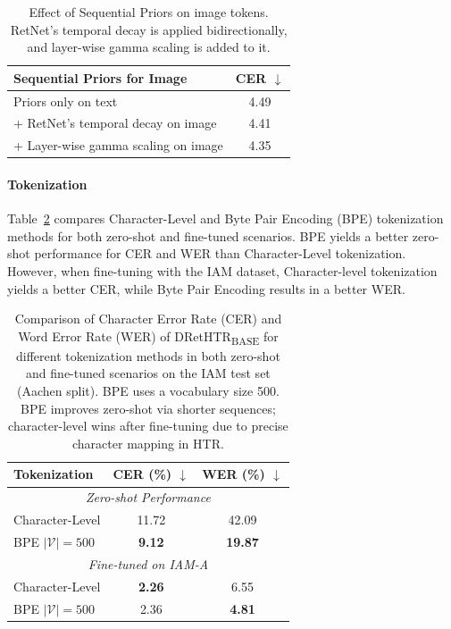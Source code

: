 \documentclass[times, review, 10pt]{elsarticle}
\begin{document}
\begin{table}[t]    
  \centering
  \caption{Effect of Sequential Priors on image tokens. RetNet’s temporal decay is applied bidirectionally, and layer-wise gamma scaling is added to it.}
    {\small
  \begin{tabular}{@{}lc@{}}
    \toprule
    \textbf{Sequential Priors for Image} & \textbf{CER} $\downarrow$ \\
    \midrule
    Priors only on text & 4.49 \\
    \hspace{0.25em}+ RetNet’s temporal decay on image & 4.41 \\
    \hspace{0.5em} + Layer-wise gamma scaling on image & 4.35 \\
    \bottomrule
  \end{tabular}
  \label{tab:sequential_priors}
  }
\end{table}
\vspace{6pt}
\paragraph{Tokenization}
Table~\ref{tab:tokenization_comparison} compares Character-Level and Byte Pair Encoding (BPE) tokenization methods for both zero-shot and fine-tuned scenarios. 
BPE yields a better zero-shot performance for CER and WER than Character-Level tokenization. However, when fine-tuning with the IAM dataset, Character-level tokenization yields a better CER, while Byte Pair Encoding results in a better WER.

\begin{table}[t]
\centering
\caption{Comparison of Character Error Rate (CER) and Word Error Rate (WER) of DRetHTR\textsubscript{BASE} for different tokenization methods in both zero-shot and fine-tuned scenarios on the IAM test set (Aachen split). BPE uses a vocabulary size 500. BPE improves zero-shot via shorter sequences; character-level wins after fine-tuning due to precise character mapping in HTR.}
{\small
\begin{tabular}{lcc}  
\toprule
\textbf{Tokenization} & \textbf{CER (\%) $\downarrow$} & \textbf{WER (\%) $\downarrow$} \\
\midrule
\multicolumn{3}{c}{\textit{Zero-shot Performance}} \\
\midrule
Character-Level & 11.72 & 42.09 \\  
BPE $|\mathcal{V}|=500$ & \phantom{1}\textbf{9.12} & \textbf{19.87} \\  
\midrule
\multicolumn{3}{c}{\textit{Fine-tuned on IAM-A}} \\
\midrule
Character-Level & \textbf{2.26} & 6.55 \\
BPE $|\mathcal{V}|=500$ & 2.36 & \textbf{4.81} \\
\bottomrule
\end{tabular}
\label{tab:tokenization_comparison}
}
\end{table}
\end{document}

